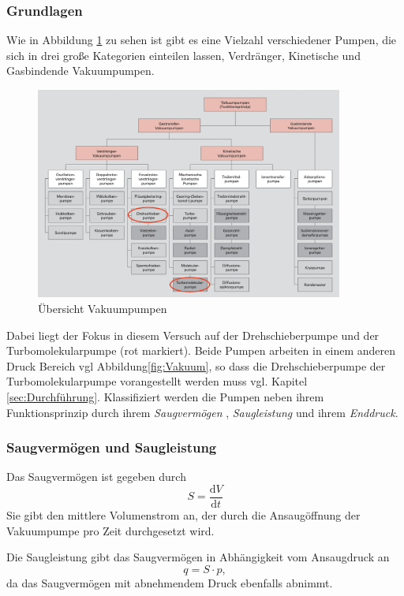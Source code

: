 \subsubsection{Grundlagen}
Wie in Abbildung \ref{fig:pumpen} zu sehen ist gibt es eine Vielzahl verschiedener Pumpen,
die sich in drei große Kategorien einteilen lassen,
Verdränger, Kinetische und Gasbindende Vakuumpumpen.
\begin{figure}[h]
    \centering
    \includegraphics[width=0.9\textwidth]{abb/pumpen.png}
    \caption{Übersicht Vakuumpumpen\cite{Pfeifer}} 
    \label{fig:pumpen}
\end{figure} 
Dabei liegt der Fokus in diesem Versuch auf der Drehschieberpumpe und der Turbomolekularpumpe (rot markiert).
Beide Pumpen arbeiten in einem anderen Druck Bereich vgl Abbildung\eqref{fig:Vakuum}, 
so dass die Drehschieberpumpe der Turbomolekularpumpe vorangestellt werden muss vgl. Kapitel \ref{sec:Durchführung}.
Klassifiziert werden die Pumpen neben ihrem Funktionsprinzip durch ihrem \textit{Saugvermögen} ,
\textit{Saugleistung} und ihrem \textit{Enddruck}.

\subsubsection*{Saugvermögen und Saugleistung}
Das Saugvermögen ist gegeben durch 
\begin{equation}
    S =\frac{\text{d}V}{\text{d}t}
\end{equation}
Sie gibt den mittlere Volumenstrom an,
der durch die Ansaugöffnung der Vakuumpumpe pro Zeit durchgesetzt wird.

Die Saugleistung gibt das Saugvermögen in Abhängigkeit vom Ansaugdruck an
\begin{equation}
    q = S\cdot p,
\end{equation}
da das Saugvermögen mit abnehmendem Druck ebenfalls abnimmt.

